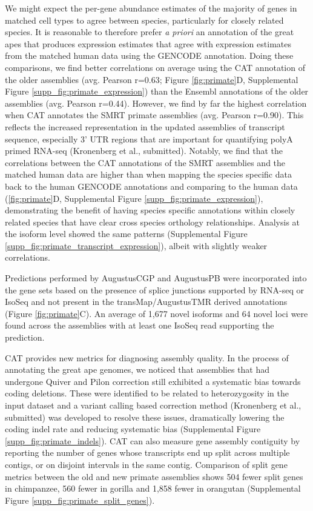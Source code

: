\documentclass[fleqn,10pt]{wlscirep}
\begin{document}
We might expect the per-gene abundance estimates of the majority of genes in matched cell types to agree between species, particularly for closely related species. It is reasonable to therefore prefer \textit{a priori} an annotation of the great apes that produces expression estimates that agree with expression estimates from the matched human data using the GENCODE annotation. Doing these comparisons, we find better correlations on average using the CAT annotation of the older assemblies (avg. Pearson r=0.63; Figure \ref{fig:primate}D, Supplemental Figure \ref{supp_fig:primate_expression}) than the Ensembl annotations of the older assemblies (avg. Pearson r=0.44). However, we find by far the highest correlation when CAT annotates the SMRT primate assemblies (avg. Pearson r=0.90). This reflects the increased representation in the updated assemblies of transcript sequence, especially 3' UTR regions that are important for quantifying polyA primed RNA-seq (Kronenberg et al., submitted). Notably, we find that the correlations between the CAT annotations of the SMRT assemblies and the matched human data are higher than when mapping the species specific data back to the human GENCODE annotations and comparing to the human data (\ref{fig:primate}D, Supplemental Figure \ref{supp_fig:primate_expression}), demonstrating the benefit of having species specific annotations within closely related species that have clear cross species orthology relationships. Analysis at the isoform level showed the same patterns (Supplemental Figure \ref{supp_fig:primate_transcript_expression}), albeit with slightly weaker correlations.

Predictions performed by AugustusCGP and AugustusPB were incorporated into the gene sets based on the presence of splice junctions supported by RNA-seq or IsoSeq and not present in the transMap/AugustusTMR derived annotations (Figure \ref{fig:primate}C). An average of 1,677 novel isoforms and 64 novel loci were found across the assemblies with at least one IsoSeq read supporting the prediction.

CAT provides new metrics for diagnosing assembly quality. In the process of annotating the great ape genomes, we noticed that assemblies that had undergone Quiver and Pilon \cite{walker2014pilon} correction still exhibited a systematic bias towards coding deletions. These were identified to be related to heterozygosity in the input dataset and a variant calling based correction method (Kronenberg et al., submitted) was developed to resolve these issues, dramatically lowering the coding indel rate and reducing systematic bias (Supplemental Figure \ref{supp_fig:primate_indels}). CAT can also measure gene assembly contiguity by reporting the number of genes whose transcripts end up split across multiple contigs, or on disjoint intervals in the same contig. Comparison of split gene metrics between the old and new primate assemblies shows 504 fewer split genes in chimpanzee, 560 fewer in gorilla and 1,858 fewer in orangutan (Supplemental Figure \ref{supp_fig:primate_split_genes}).
\end{document}
